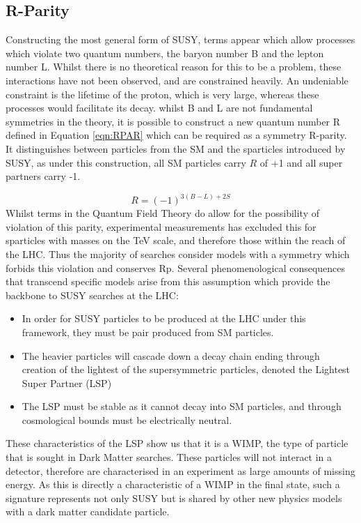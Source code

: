 \subsection{R-Parity}

Constructing the most general form of SUSY, terms appear which allow processes which violate two quantum numbers, the baryon number B and the lepton number L. Whilst there is no theoretical reason for this to be a problem, these interactions have not been observed, and are constrained heavily. An undeniable constraint is the lifetime of the proton, which is very large, whereas these processes would facilitate its decay. whilst B and L are not fundamental symmetries in the theory, it is possible to construct a new quantum number R defined in Equation \ref{eqn:RPAR} which can be required as a symmetry R-parity\cite{terning}. It distinguishes between particles from the SM and the sparticles introduced by SUSY, as under this construction, all SM particles carry $R$ of +1 and all super partners carry -1. 

\begin{equation}
R = (-1)^{3(B-L)+2S}
\label{eqn:RPAR}
\end{equation}
Whilst terms in the Quantum Field Theory do allow for the possibility of violation of this parity, experimental measurements has excluded this for sparticles with masses on the TeV scale, and therefore those within the reach of the LHC. Thus the  majority of searches consider models with a symmetry which forbids this violation and conserves Rp. Several phenomenological consequences that transcend specific models arise from this assumption which provide the backbone to SUSY searches at the LHC:

\begin{itemize}
\item{In order for SUSY particles to be produced at the LHC under this framework, they must be pair produced from SM particles.} 

\item{The heavier particles will cascade down a decay chain ending through creation of the lightest of the supersymmetric particles, denoted the Lightest Super Partner (LSP)}

\item{The LSP must be stable as it cannot decay into SM particles, and through cosmological bounds must be electrically neutral.} 
\end{itemize}
These characteristics of the LSP show us that it is a WIMP, the type of particle that is sought in Dark Matter searches.  These particles will not interact in a detector, therefore are characterised in an experiment as large amounts of missing energy. As this is directly a characteristic of a WIMP in the final state, such a signature represents not only SUSY but is shared by other new physics models with a dark matter candidate particle. 

